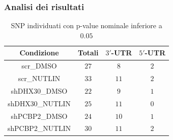\documentclass[aspectration=1610]{beamer}
\begin{document}
	\begin{frame}
		\frametitle{Analisi dei risultati}
		\begin{table}[H]
			\begin{tabular}{|c|c|c|c|}
				\hline
				Condizione & Totali & $3'$-UTR & $5'$-UTR\\
				\hline
				scr\_DMSO & $27$ & $8$ & $2$\\
				\hline
				scr\_NUTLIN & $33$ & $11$ &$2$\\
				\hline
				shDHX30\_DMSO & $22$ & $9$ & $1$\\
				\hline
				shDHX30\_NUTLIN & $25$ & $11$ & $0$\\
				\hline
				shPCBP2\_DMSO & $24$ & $10$ & $1$\\
				\hline
				shPCBP2\_NUTLIN & $30$ & $11$ & $2$\\
				\hline
			\end{tabular}
			\caption{SNP individuati con p-value nominale inferiore a $0.05$}
		\end{table}
	\end{frame}
\end{document}
